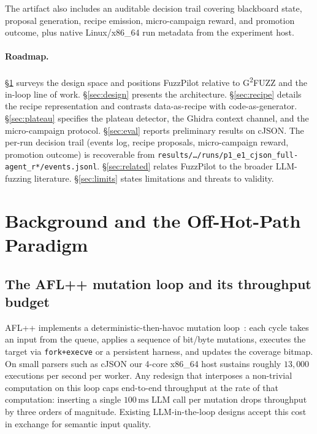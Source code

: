 \documentclass[11pt]{article}
\begin{document}
The artifact also includes an auditable decision trail covering
blackboard state, proposal generation, recipe emission,
micro-campaign reward, and promotion outcome, plus native
Linux/x86\_64 run metadata from the experiment host.

\paragraph{Roadmap.} \S\ref{sec:bg} surveys the design space and
positions FuzzPilot relative to G\textsuperscript{2}FUZZ and the
in-loop line of work. \S\ref{sec:design} presents the architecture.
\S\ref{sec:recipe} details the recipe representation and contrasts
data-as-recipe with code-as-generator. \S\ref{sec:plateau} specifies
the plateau detector, the Ghidra context channel, and the
micro-campaign protocol. \S\ref{sec:eval} reports preliminary
results on cJSON. The per-run decision trail (events log, recipe
proposals, micro-campaign reward, promotion outcome) is recoverable
from \texttt{results/\ldots/runs/p1\_e1\_cjson\_full-agent\_r*/events.jsonl}.
\S\ref{sec:related} relates
FuzzPilot to the broader LLM-fuzzing literature.
\S\ref{sec:limits} states limitations and threats to validity.

\section{Background and the Off-Hot-Path Paradigm}
\label{sec:bg}

\subsection{The AFL++ mutation loop and its throughput budget}
\label{sec:bg:afl}

AFL++ implements a deterministic-then-havoc mutation
loop~\cite{aflplusplus}: each cycle takes an input from the queue,
applies a sequence of bit/byte mutations, executes the target via
\texttt{fork+execve} or a persistent harness, and updates the
coverage bitmap. On small parsers such as cJSON our 4-core x86\_64
host sustains roughly $13{,}000$ executions per second per worker.
Any redesign that interposes a non-trivial computation on this loop
caps end-to-end throughput at the rate of that computation:
inserting a single $100\,\mathrm{ms}$ LLM call per mutation drops
throughput by three orders of magnitude. Existing
LLM-in-the-loop designs accept this cost in exchange for semantic
input quality.
\end{document}
